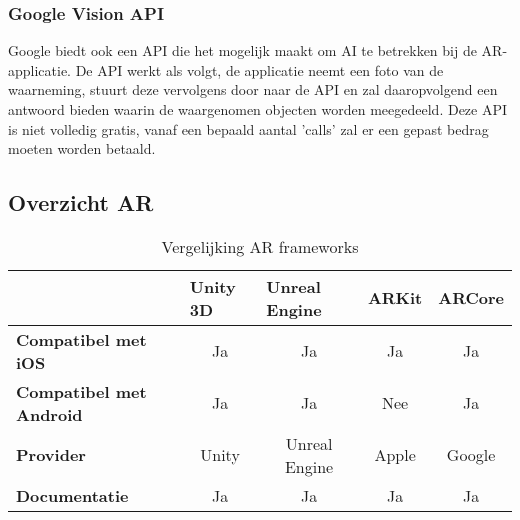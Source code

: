 \subsubsection{Google Vision API}
Google biedt ook een API die het mogelijk maakt om AI te betrekken bij de AR-applicatie. De API werkt als volgt, de applicatie neemt een foto van de waarneming, stuurt deze vervolgens door naar de API en zal daaropvolgend een antwoord bieden waarin de waargenomen objecten worden meegedeeld. Deze API is niet volledig gratis, vanaf een bepaald aantal 'calls' zal er een gepast bedrag moeten worden betaald.

\subsection{Overzicht AR}
\begin{table}[H]
	\centering
	\begin{tabular}{|l|c|c|c|c|}
		\hline
		& \multicolumn{1}{l|}{Unity 3D} & \multicolumn{1}{l|}{Unreal Engine} & \multicolumn{1}{l|}{ARKit} & \multicolumn{1}{l|}{ARCore} \\ \hline
		\textbf{Compatibel met iOS}     & Ja                            & Ja                                 & Ja                         & Ja                          \\ \hline
		\textbf{Compatibel met Android} & Ja                            & Ja                                 & Nee                        & Ja                          \\ \hline
		\textbf{Provider}               & Unity                         & Unreal Engine                      & Apple                      & Google                      \\ \hline
		\textbf{Documentatie}           & Ja                            & Ja                                 & Ja                         & Ja                          \\ \hline
	\end{tabular}
	\caption{Vergelijking AR frameworks}
\end{table}

